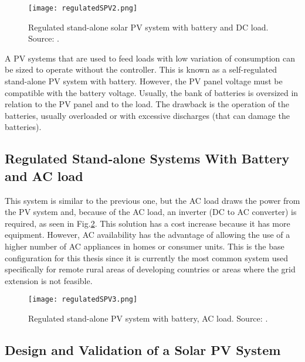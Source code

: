 \begin{figure}[h]
\texttt{[image: regulatedSPV2.png]}
\centering
\caption{Regulated stand-alone solar PV system with battery and DC load. Source: \cite{Roy}.}
\label{fig:regSPV2}
\end{figure}

A PV systems that are used to feed loads with low variation of consumption can be sized to operate without the controller. This is known as a self-regulated stand-alone PV system with battery. However, the PV panel voltage must be compatible with the battery voltage. Usually, the bank of batteries is oversized in relation to the PV panel and to the load. The drawback is the operation of the batteries, usually overloaded or with excessive discharges (that can damage the batteries).

\subsection{Regulated Stand-alone Systems With Battery and AC load}

This system is similar to the previous one, but the AC load draws the power from the PV system and, because of the AC load, an inverter (DC to AC converter) is required, as seen in Fig.\ref{fig:regSPV3}. This solution has a cost increase because it has more equipment. However, AC availability has the advantage of allowing the use of a higher number of AC appliances in homes or consumer units. This is the base configuration for this thesis since it is currently the most common system used specifically for remote rural areas of developing countries or areas where the grid extension is not feasible.

\begin{figure}[h]
\texttt{[image: regulatedSPV3.png]}
\centering
\caption{Regulated stand-alone PV system with battery, AC load. Source: \cite{Roy}.}
\label{fig:regSPV3}
\end{figure}

\subsection{Design and Validation of a Solar PV System}

